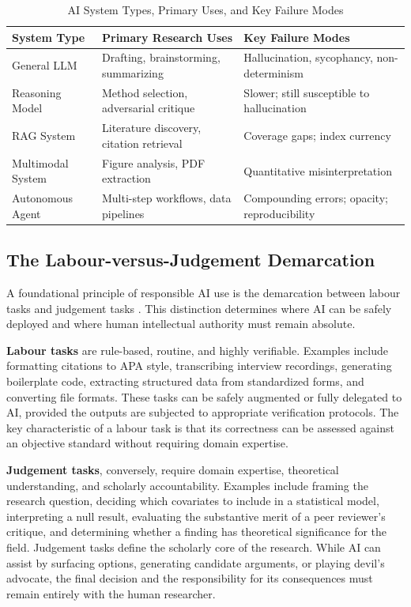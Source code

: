 \documentclass[12pt, a4paper]{article}
\begin{document}
\begin{table}[ht]
\centering
\caption{AI System Types, Primary Uses, and Key Failure Modes}
\label{tab:ecosystem}
\begin{tabularx}{\textwidth}{lXX}
\toprule
\textbf{System Type} & \textbf{Primary Research Uses} & \textbf{Key Failure Modes} \\
\midrule
General LLM & Drafting, brainstorming, summarizing & Hallucination, sycophancy, non-determinism \\
Reasoning Model & Method selection, adversarial critique & Slower; still susceptible to hallucination \\
RAG System & Literature discovery, citation retrieval & Coverage gaps; index currency \\
Multimodal System & Figure analysis, PDF extraction & Quantitative misinterpretation \\
Autonomous Agent & Multi-step workflows, data pipelines & Compounding errors; opacity; reproducibility \\
\bottomrule
\end{tabularx}
\end{table}

\subsection{The Labour-versus-Judgement Demarcation}

A foundational principle of responsible AI use is the demarcation between labour tasks and judgement tasks \citep{zyphur2026responsible}. This distinction determines where AI can be safely deployed and where human intellectual authority must remain absolute.

\textbf{Labour tasks} are rule-based, routine, and highly verifiable. Examples include formatting citations to APA style, transcribing interview recordings, generating boilerplate code, extracting structured data from standardized forms, and converting file formats. These tasks can be safely augmented or fully delegated to AI, provided the outputs are subjected to appropriate verification protocols. The key characteristic of a labour task is that its correctness can be assessed against an objective standard without requiring domain expertise.

\textbf{Judgement tasks}, conversely, require domain expertise, theoretical understanding, and scholarly accountability. Examples include framing the research question, deciding which covariates to include in a statistical model, interpreting a null result, evaluating the substantive merit of a peer reviewer's critique, and determining whether a finding has theoretical significance for the field. Judgement tasks define the scholarly core of the research. While AI can assist by surfacing options, generating candidate arguments, or playing devil's advocate, the final decision and the responsibility for its consequences must remain entirely with the human researcher.
\end{document}
